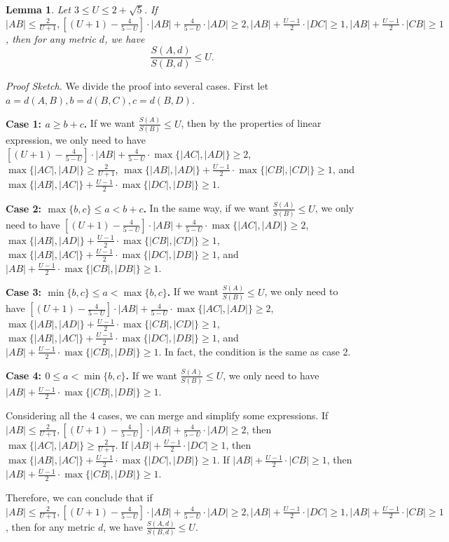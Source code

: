 \documentclass[11pt]{article}
\newtheorem{lemma}[theorem]{Lemma}
\theoremstyle{remark}
\begin{document}
\begin{lemma}\label{lem:62}
 Let $3\le U \le 2+\sqrt5 $. If $ |AB|\le \frac{2}{U+1}, [(U+1)-\frac{4}{5-U}]\cdot|AB| + \frac{4}{5-U}\cdot|AD| \ge 2, |AB| + \frac{U-1}{2}\cdot|DC| \ge 1, |AB| + \frac{U-1}{2}\cdot|CB| \ge 1 $, then for any metric $d$, we have
$$ \frac{S(A,d)}{S(B,d)} \le U. $$
\end{lemma}

\emph{Proof Sketch.}
We divide the proof into several cases. First let $a=d(A,B), b=d(B,C), c=d(B,D).$

\textbf{Case 1: $a \ge b+c$.} If we want $\frac{S(A)}{S(B)}\le U$, then by the properties of linear expression, we only need to have $[(U+1)-\frac{4}{5-U}]\cdot|AB| + \frac{4}{5-U}\cdot\max \{|AC|, |AD|\} \ge 2$, $\max \{|AC|, |AD|\} \ge \frac{2}{U+1}$, $\max \{|AB|, |AD|\} + \frac{U-1}{2}\cdot \max \{|CB|, |CD|\} \ge 1$, and $\max \{|AB|, |AC|\} + \frac{U-1}{2}\cdot \max \{|DC|, |DB|\} \ge 1$.

\textbf{Case 2: $\max\{b,c\} \le a < b+c$.} In the same way, if we want $\frac{S(A)}{S(B)}\le U$, we only need to have $[(U+1)-\frac{4}{5-U}]\cdot|AB| + \frac{4}{5-U}\cdot\max \{|AC|, |AD|\} \ge 2$, $\max \{|AB|, |AD|\} + \frac{U-1}{2}\cdot \max \{|CB|, |CD|\} \ge 1$, $\max \{|AB|, |AC|\} + \frac{U-1}{2}\cdot \max \{|DC|, |DB|\} \ge 1$, and $|AB| + \frac{U-1}{2}\cdot \max \{|CB|, |DB|\} \ge 1$.

\textbf{Case 3: $\min\{b,c\} \le a < \max\{b,c\}$.} If we want $\frac{S(A)}{S(B)}\le U$, we only need to have $[(U+1)-\frac{4}{5-U}]\cdot|AB| + \frac{4}{5-U}\cdot\max \{|AC|, |AD|\} \ge 2$, $\max \{|AB|, |AD|\} + \frac{U-1}{2}\cdot \max \{|CB|, |CD|\} \ge 1$, $\max \{|AB|, |AC|\} + \frac{U-1}{2}\cdot \max \{|DC|, |DB|\} \ge 1$, and $|AB| + \frac{U-1}{2}\cdot \max \{|CB|, |DB|\} \ge 1$. In fact, the condition is the same as case 2.

\textbf{Case 4: $0 \le a < \min\{b,c\}$.} If we want $\frac{S(A)}{S(B)}\le U$, we only need to have $|AB| + \frac{U-1}{2}\cdot \max \{|CB|, |DB|\} \ge 1$.

Considering all the 4 cases, we can merge and simplify some expressions. If $|AB|\le \frac{2}{U+1}, [(U+1)-\frac{4}{5-U}]\cdot|AB| + \frac{4}{5-U}\cdot|AD| \ge 2$, then $\max \{|AC|, |AD|\} \ge \frac{2}{U+1}$. If $|AB| + \frac{U-1}{2}\cdot|DC| \ge 1$, then $\max \{|AB|, |AC|\} + \frac{U-1}{2}\cdot \max \{|DC|, |DB|\} \ge 1$. If $|AB| + \frac{U-1}{2}\cdot|CB| \ge 1$, then $|AB| + \frac{U-1}{2}\cdot \max \{|CB|, |DB|\} \ge 1$.

Therefore, we can conclude that if $ |AB|\le \frac{2}{U+1}, [(U+1)-\frac{4}{5-U}]\cdot|AB| + \frac{4}{5-U}\cdot|AD| \ge 2, |AB| + \frac{U-1}{2}\cdot|DC| \ge 1, |AB| + \frac{U-1}{2}\cdot|CB| \ge 1 $, then for any metric $d$, we have $ \frac{S(A,d)}{S(B,d)} \le U. $
\end{document}
